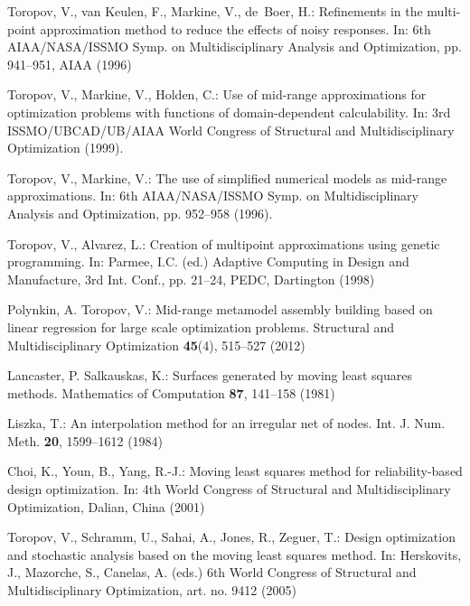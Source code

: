 \documentclass{llncs}
\begin{document}
\begin{thebibliography}{10}
Toropov, V., van Keulen, F., Markine, V., de~Boer, H.:
\newblock Refinements in the multi-point approximation method to reduce the effects of noisy responses.
\newblock In: 6th AIAA/NASA/ISSMO Symp. on Multidisciplinary Analysis and Optimization,  pp. 941--951, AIAA (1996)

Toropov, V., Markine, V., Holden, C.:
\newblock Use of mid-range approximations for optimization problems with functions of domain-dependent calculability.
\newblock In: 3rd ISSMO/UBCAD/UB/AIAA World Congress of Structural and Multidisciplinary Optimization (1999).

Toropov, V., Markine, V.:
\newblock The use of simplified numerical models as mid-range approximations.
\newblock In: 6th AIAA/NASA/ISSMO Symp. on Multidisciplinary Analysis and Optimization, pp. 952--958 (1996).

Toropov, V., Alvarez, L.:
\newblock Creation of multipoint approximations using genetic programming.
\newblock In: Parmee, I.C. (ed.) Adaptive Computing in Design and Manufacture, 3rd Int. Conf.,
   pp. 21--24, PEDC, Dartington (1998)

Polynkin, A. Toropov, V.:
\newblock Mid-range metamodel assembly building based on linear regression for large scale optimization problems.
\newblock Structural and Multidisciplinary Optimization \textbf{45}(4), 515--527 (2012)

Lancaster, P. Salkauskas, K.:
\newblock Surfaces generated by moving least squares methods.
\newblock Mathematics of Computation \textbf{87}, 141--158 (1981)

Liszka, T.:
\newblock An interpolation method for an irregular net of nodes.
\newblock Int. J. Num. Meth. \textbf{20}, 1599--1612 (1984)

Choi, K., Youn, B., Yang, R.-J.:
\newblock Moving least squares method for reliability-based design optimization.
\newblock In: 4th World Congress of Structural and Multidisciplinary Optimization, Dalian, China (2001)

Toropov, V., Schramm, U., Sahai, A., Jones, R., Zeguer, T.:
\newblock Design optimization and stochastic analysis based on the moving least squares method.
\newblock In: Herskovits, J., Mazorche, S., Canelas, A. (eds.) 6th World Congress of Structural and Multidisciplinary Optimization, art. no. 9412 (2005)


\end{thebibliography}
\end{document}
